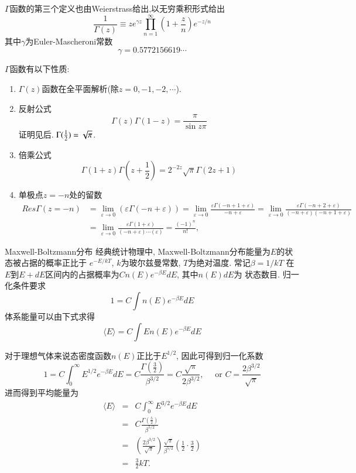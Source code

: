 $\Gamma$函数的第三个定义也由Weierstrass给出,以无穷乘积形式给出
\begin{equation}
\frac{1}{\Gamma(z)} \equiv z e^{\gamma z} \prod_{n=1}^{\infty}\left(1+\frac{z}{n}\right) e^{-z / n}
\end{equation}
其中$\gamma$为Euler-Mascheroni常数
$$
\gamma=0.5772156619 \cdots
$$

$\Gamma$函数有以下性质:
\begin{enumerate}
    \item $\Gamma(z)$函数在全平面解析(除$z=0, -1, -2, \cdots$).
    \item 反射公式
    $$
        \Gamma(z) \Gamma(1-z)=\frac{\pi}{\sin z \pi}
    $$ 证明见后. $\Gamma({\frac{1}{2}}) = \sqrt{\pi}$.
    \item 倍乘公式
    $$
    \Gamma(1+z) \Gamma\left(z+\frac{1}{2}\right)=2^{-2 z} \sqrt{\pi} \Gamma(2 z+1)
    $$
    \item 单极点$z=-n$处的留数
    $$
    \begin{aligned}
    Res \Gamma(z=-n) & =\lim _{\varepsilon \rightarrow 0}(\varepsilon \Gamma(-n+\varepsilon))=\lim _{\varepsilon \rightarrow 0} \frac{\varepsilon \Gamma(-n+1+\varepsilon)}{-n+\varepsilon}=\lim _{\varepsilon \rightarrow 0} \frac{\varepsilon \Gamma(-n+2+\varepsilon)}{(-n+\varepsilon)(-n+1+\varepsilon)} \\
    & =\lim _{\varepsilon \rightarrow 0} \frac{\varepsilon \Gamma(1+\varepsilon)}{(-n+\varepsilon) \cdots(\varepsilon)}=\frac{(-1)^{n}}{n !},
    \end{aligned}
    $$
\end{enumerate}

\begin{examplebox}{Maxwell-Boltzmann分布}
    经典统计物理中, Maxwell-Boltzmann分布能量为$E$的状态被占据的概率正比于
    $e^{-E/kT}$, $k$为玻尔兹曼常数, $T$为绝对温度. 常记$\beta=1 / k T$
    在$E$到$E+dE$区间内的占据概率为$C n(E) e^{-\beta E} dE$, 其中$n(E)dE$为
    状态数目. 归一化条件要求
    $$
    1=C \int n(E) e^{-\beta E} d E
    $$
    体系能量可以由下式求得
    $$
    \langle E\rangle=C \int E n(E) e^{-\beta E} d E
    $$


    对于理想气体来说态密度函数$n(E)$正比于$E^{1/2}$, 因此可得到归一化系数
    $$
    1=C \int_0^{\infty} E^{1 / 2} e^{-\beta E} d E=C \frac{\Gamma\left(\frac{3}{2}\right)}{\beta^{3 / 2}}=C \frac{\sqrt{\pi}}{2 \beta^{3 / 2}}, \quad \text { or } C=\frac{2 \beta^{3 / 2}}{\sqrt{\pi}}
    $$
    进而得到平均能量为
    \begin{eqnarray*}
        \langle E\rangle
        &=&C \int_{0}^{\infty} E^{3 / 2} e^{-\beta E} d E 
        \\
        &=&C \frac{\Gamma\left(\frac{5}{2}\right)}{\beta^{5 / 2}}
        \\
        &=&\left(\frac{2 \beta^{3 / 2}}{\sqrt{\pi}}\right) 
        \frac{\sqrt{\pi}}{\beta^{5 / 2}}\left(\frac{1}{2} \cdot \frac{3}{2}\right)
        \\
        &=&\frac{3}{2} k T.
    \end{eqnarray*}
\end{examplebox}

